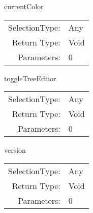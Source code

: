 \item currentColor\\
\begin{tabular}{rl}
  SelectionType: & Any\\
    Return Type: & Void\\
     Parameters: & 0\\
\end{tabular}

\item toggleTreeEditor\\
\begin{tabular}{rl}
  SelectionType: & Any\\
    Return Type: & Void\\
     Parameters: & 0\\
\end{tabular}

\item version\\
\begin{tabular}{rl}
  SelectionType: & Any\\
    Return Type: & Void\\
     Parameters: & 0\\
\end{tabular}


